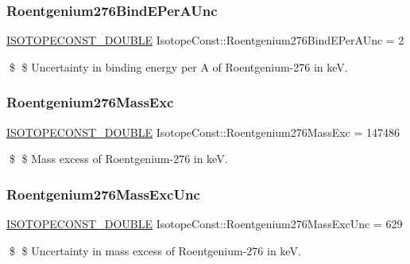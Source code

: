 \subsubsection{\texorpdfstring{Roentgenium276\+Bind\+E\+Per\+A\+Unc}{Roentgenium276BindEPerAUnc}}
{\footnotesize\ttfamily \mbox{\hyperlink{group___isotope_const-_macros_ga8f45a7272ce02c0b4c65c44636ed719a}{I\+S\+O\+T\+O\+P\+E\+C\+O\+N\+S\+T\+\_\+\+D\+O\+U\+B\+LE}} Isotope\+Const\+::\+Roentgenium276\+Bind\+E\+Per\+A\+Unc = 2}

\$ \$ Uncertainty in binding energy per A of Roentgenium-\/276 in keV. \mbox{\label{group___isotope_const-_roentgenium-_rg276_ga443e71ba99a7ac6b3c932a431f822b33}} 
\subsubsection{\texorpdfstring{Roentgenium276\+Mass\+Exc}{Roentgenium276MassExc}}
{\footnotesize\ttfamily \mbox{\hyperlink{group___isotope_const-_macros_ga8f45a7272ce02c0b4c65c44636ed719a}{I\+S\+O\+T\+O\+P\+E\+C\+O\+N\+S\+T\+\_\+\+D\+O\+U\+B\+LE}} Isotope\+Const\+::\+Roentgenium276\+Mass\+Exc = 147486}

\$ \$ Mass excess of Roentgenium-\/276 in keV. \mbox{\label{group___isotope_const-_roentgenium-_rg276_gadd31dbbfda841d19440a979631f42dbb}} 
\subsubsection{\texorpdfstring{Roentgenium276\+Mass\+Exc\+Unc}{Roentgenium276MassExcUnc}}
{\footnotesize\ttfamily \mbox{\hyperlink{group___isotope_const-_macros_ga8f45a7272ce02c0b4c65c44636ed719a}{I\+S\+O\+T\+O\+P\+E\+C\+O\+N\+S\+T\+\_\+\+D\+O\+U\+B\+LE}} Isotope\+Const\+::\+Roentgenium276\+Mass\+Exc\+Unc = 629}

\$ \$ Uncertainty in mass excess of Roentgenium-\/276 in keV. \mbox{\label{group___isotope_const-_roentgenium-_rg276_ga106e3c663ab9a8761a49994273f28cca}} 

